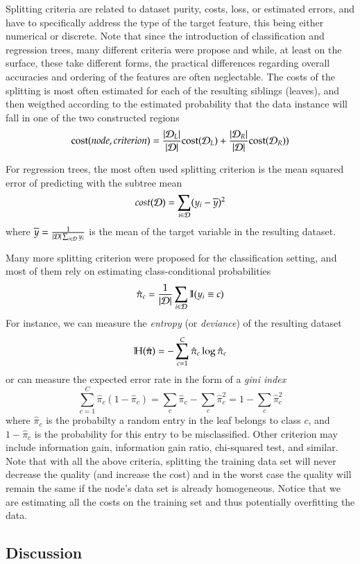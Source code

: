 \begin{refsection}
Splitting criteria are related to dataset purity, costs, loss, or estimated errors, and have to specifically address the type of the target feature, this being either numerical or discrete. Note that since the introduction of classification and regression trees, many different criteria were propose and while, at least on the surface, these take different forms, the practical differences regarding overall accuracies and ordering of the features are often neglectable. The costs of the splitting is most often estimated for each of the resulting siblings (leaves), and then weigthed according to the estimated probability that the data instance will fall in one of the two constructed regions
$$ {\rm cost}(node, criterion) = {|\mathcal{D}_L|\over |\mathcal{D}|}{\rm cost}(\mathcal{D}_L) + {|\mathcal{D}_R|\over |\mathcal{D}|}{\rm cost}(\mathcal{D}_R)) $$

For regression trees, the most often used splitting criterion is the mean squared error of predicting with the subtree mean
$$ cost(\mathcal{D}) = \sum_{i\in\mathcal{D}}(y_i-\overline{y})^2 $$
where $\overline{y} = {1\over|\mathcal{D}|\sum_{i\in\mathcal{D}}y_i}$ is the mean of the target variable in the resulting dataset.

Many more splitting criterion were proposed for the classification setting, and most of them rely on estimating class-conditional probabilities
$$ \hat{\pi}_c = {1\over|\mathcal{D}|}\sum_{i\in\mathcal{D}}\mathbb{I}(y_i\equiv c) $$
For instance, we can measure the {\em entropy} (or {\em deviance}) of the resulting dataset
$$ \mathbb{H}(\hat{\boldsymbol{\pi}}) = -\sum_{c=1}^C \hat{\pi}_c \log \hat{\pi}_c $$
or can measure the expected error rate in the form of a {\em gini index}
$$ \sum_{c=1}^C \hat{\pi}_c (1-\hat{\pi}_c) = \sum_c \hat{\pi}_c - \sum_c \hat{\pi}_c^2 = 1 - \sum_c \hat{\pi}_c^2 $$
where $\hat{\pi}_c$ is the probabilty a random entry in the leaf belongs to class $c$, and $1-\hat{\pi}_c$ is the probability for this entry to be misclassified. Other criterion may include information gain, information gain ratio, chi-squared test, and similar. Note that with all the above criteria, splitting the training data set will never decrease the quality (and increase the cost) and in the worst case the quality will remain the same if the node's data set is already homogeneous. Notice that we are estimating all the costs on the training set and thus potentially overfitting the data.

\subsection*{Discussion}


\end{refsection}
